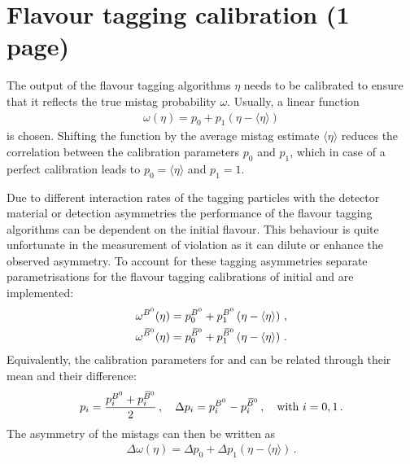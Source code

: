 
\section{Flavour tagging calibration (1 page)}
\label{sec:dataanalysis:taggingcalibration}

The output of the flavour tagging algorithms $\eta$ needs to be calibrated to
ensure that it reflects the true mistag probability $\omega$. Usually, a
linear function
\begin{align}
	\omega(\eta) = p_0 + p_1 (\eta - \langle\eta\rangle)
\label{eq:dataanalysis:taggingcalibration:generalfunction}
\end{align}
is chosen. Shifting the function by the average mistag estimate
$\langle\eta\rangle$ reduces the correlation between the calibration
parameters $p_0$ and $p_1$, which in case of a perfect calibration leads to
$p_0 = \langle\eta\rangle$ and $p_1 = 1$.

Due to different interaction rates of the tagging particles with the detector
material or detection asymmetries the performance of the flavour tagging
algorithms can be dependent on the initial flavour. This behaviour is quite
unfortunate in the measurement of \CP violation as it can dilute or enhance
the observed asymmetry. To account for these tagging asymmetries separate
parametrisations for the flavour tagging calibrations of initial \Bd and \Bzb
are implemented:
\begin{equation}
\begin{split}
  \omega^{{{B}^0} }(\eta) = p_0^{{{B}^0} } + p_1^{{{B}^0} }\left(\eta - \langle\eta\rangle\right) \, , \\
  \omega^{{{\kern 0.18em\overline{\kern -0.18em B}{}}{}^0}}(\eta) = p_0^{{{\kern 0.18em\overline{\kern -0.18em B}{}}{}^0}} + p_1^{{{\kern 0.18em\overline{\kern -0.18em B}{}}{}^0}}\left(\eta - \langle\eta\rangle\right) \, .
\end{split}
\label{eq:dataanalysis:taggingcalibration:individual_parametrisations}
\end{equation}
Equivalently, the calibration parameters for \Bd and \Bzb can be related
through their mean and their difference:
\begin{equation}
  p_i        = \frac{p_i^{{{B}^0} } + p_i^{{{\kern 0.18em\overline{\kern -0.18em B}{}}{}^0}}}{2} \, , \quad
  \Delta p_i = p_i^{{{B}^0} } - p_i^{{{\kern 0.18em\overline{\kern -0.18em B}{}}{}^0}} \, , \quad
  \text{with }i = 0,1 \,.
\label{eq:dataanalysis:taggingcalibration:individual_pis}
\end{equation}
The asymmetry of the mistags can then be written as
\begin{align}
	\Delta\omega(\eta) = \Delta p_0 + \Delta p_1 (\eta - \langle\eta\rangle)\,.
\label{eq:dataanalysis:taggingcalibration:mistagasymmetry}
\end{align}

